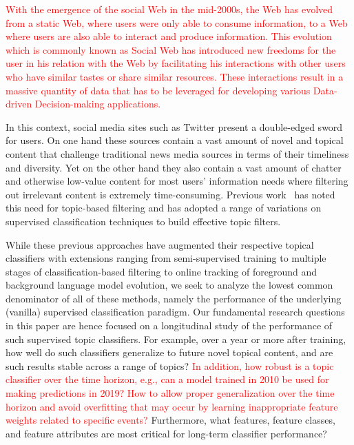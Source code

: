 
\label{sec:introduction}
\textcolor{red}{With the emergence of the social Web in the mid-2000s, the Web has evolved from a static Web, where users were only able to consume information, to a Web where users are also able to interact and produce information. This evolution which is commonly known as Social Web has introduced new freedoms for the user in his relation with the Web by facilitating his interactions with other users who have similar tastes or share similar resources.
These interactions result in a massive quantity of data that has to be leveraged for developing various Data-driven Decision-making applications.} 

In this context, social media sites such as Twitter present a double-edged sword for
users.  On one hand these sources contain a vast amount of novel and
topical content that challenge traditional news media sources in terms
of their timeliness and diversity.  Yet on the other hand they also
contain a vast amount of chatter and otherwise low-value content for most
users' information needs where filtering out irrelevant content is
extremely time-consuming.  Previous work~\cite{lin2011smoothing,yang2014large,magdy} 
has noted this need for topic-based filtering and has adopted a range
of variations on supervised classification techniques to build effective
topic filters.

While these previous approaches have augmented their respective topical classifiers with extensions ranging from semi-supervised training to multiple stages of classification-based filtering to online tracking of foreground and background language model evolution, 
we seek to analyze the lowest common denominator
of all of these methods, namely the performance of the underlying (vanilla) supervised 
classification paradigm.
Our fundamental research questions in this paper are hence focused on a longitudinal study 
of the performance of such supervised topic classifiers.  
For example, over a year or more after training, how well do such classifiers generalize to future novel topical content, and are such results stable across a range of topics?  \textcolor{red}{In addition, how robust is a topic classifier over the time horizon, e.g., can a model trained in 2010 be used for making predictions in 2019? How to allow proper generalization over the  time horizon and avoid overfitting that may occur by learning inappropriate feature weights related to specific events?} Furthermore, what features, feature classes, and feature attributes are most critical for long-term classifier performance?  

